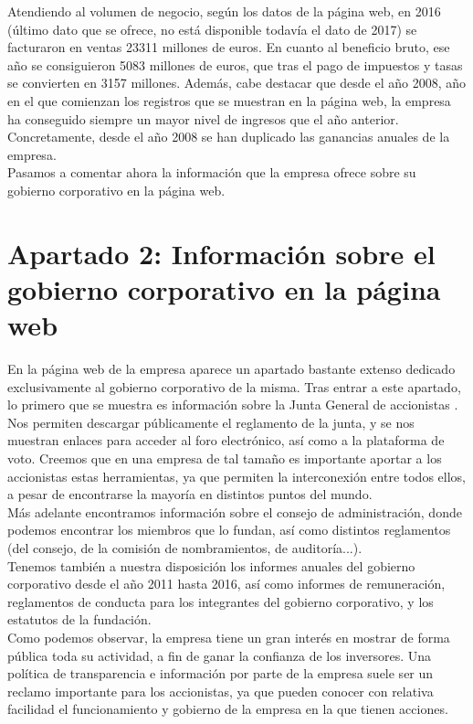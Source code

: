 \documentclass[11pt]{article}
\theoremstyle{plain}
\theoremstyle{definition}
\begin{document}
Atendiendo al volumen de negocio, según los datos de la página web, en
2016 (último dato que se ofrece, no está disponible todavía el dato de
2017) se facturaron en ventas 23311 millones de euros. En cuanto al
beneficio bruto, ese año se consiguieron 5083 millones de euros, que
tras el pago de impuestos y tasas se convierten en 3157 millones.
Además, cabe destacar que desde el año 2008, año en el que comienzan
los registros que se muestran en la página web, la empresa ha
conseguido siempre un mayor nivel de ingresos que el año
anterior. Concretamente, desde el año 2008 se han duplicado las
ganancias anuales de la empresa.\\

Pasamos a comentar ahora la información que la empresa ofrece sobre su
gobierno corporativo en la página web.

\section*{Apartado 2: Información sobre el gobierno corporativo en la
  página web}

En la página web de la empresa aparece un apartado bastante extenso
dedicado exclusivamente al gobierno corporativo de la misma. Tras
entrar a este apartado, lo primero que se muestra es información sobre
la Junta General de accionistas \cite{corp-gov}. Nos permiten
descargar públicamente el reglamento de la junta, y se nos muestran
enlaces para acceder al foro electrónico, así como a la plataforma de
voto. Creemos que en una empresa de tal tamaño es importante aportar a
los accionistas estas herramientas, ya que permiten la interconexión
entre todos ellos, a pesar de encontrarse la mayoría en distintos
puntos del mundo.\\

Más adelante encontramos información sobre el consejo de
administración, donde podemos encontrar los miembros que lo fundan,
así como distintos reglamentos (del consejo, de la comisión de
nombramientos, de auditoría...).\\

Tenemos también a nuestra disposición los informes anuales del
gobierno corporativo desde el año 2011 hasta 2016, así como informes
de remuneración, reglamentos de conducta para los integrantes
del gobierno corporativo, y los estatutos de la fundación.\\

Como podemos observar, la empresa tiene un gran interés en mostrar de
forma pública toda su actividad, a fin de ganar la confianza de los
inversores. Una política de transparencia e información por parte de
la empresa suele ser un reclamo importante para los accionistas, ya
que pueden conocer con relativa facilidad el funcionamiento y
gobierno de la empresa en la que tienen acciones.\\
\end{document}
